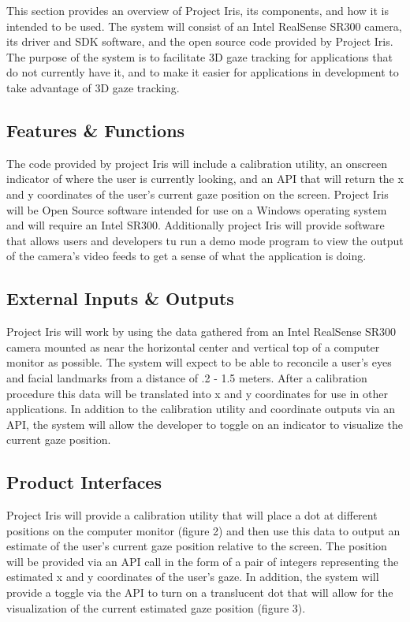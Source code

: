 This section provides an overview of Project Iris, its components, and how it is intended to be used. The system will consist of an Intel RealSense SR300 camera, its driver and SDK software, and the open source code provided by Project Iris. The purpose of the system is to facilitate 3D gaze tracking for applications that do not currently have it, and to make it easier for applications in development to take advantage of 3D gaze tracking. 

\subsection{Features \& Functions}
The code provided by project Iris will include a calibration utility, an onscreen indicator of where the user is currently looking, and an API that will return the x and y coordinates of the user's current gaze position on the screen. Project Iris will be Open Source software intended for use on a Windows operating system and will require an Intel SR300. Additionally project Iris will provide software that allows users and developers tu run a demo mode program to view the output of the camera's video feeds to get a sense of what the application is doing. 

\subsection{External Inputs \& Outputs}
Project Iris will work by using the data gathered from an Intel RealSense SR300 camera mounted as near the horizontal center and vertical top of a computer monitor as possible. The system will expect to be able to reconcile a user's eyes and facial landmarks from a distance of .2 - 1.5 meters. After a calibration procedure this data will be translated into x and y coordinates for use in other applications. In addition to the calibration utility and coordinate outputs via an API, the system will allow the developer to toggle on an indicator to visualize the current gaze position.

\subsection{Product Interfaces}
Project Iris will provide a calibration utility that will place a dot at different positions on the computer monitor (figure 2) and then use this data to output an estimate of the user's current gaze position relative to the screen. The position will be provided via an API call in the form of a pair of integers representing the estimated x and y coordinates of the user's gaze. In addition, the system will provide a toggle via the API to turn on a translucent dot that will allow for the visualization of the current estimated gaze position (figure 3).

